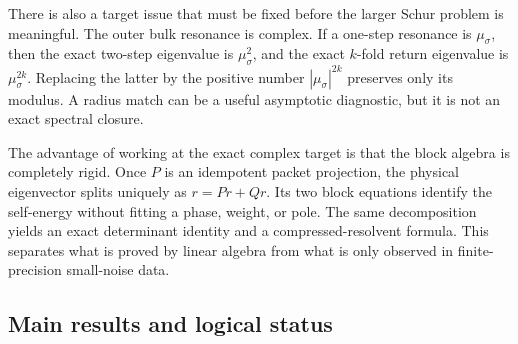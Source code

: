 \documentclass[11pt]{article}
\theoremstyle{definition}
\theoremstyle{remark}
\begin{document}
There is also a target issue that must be fixed before the larger Schur
problem is meaningful.  The outer bulk resonance is complex.  If a
one-step resonance is $\mu_\sigma$, then the exact two-step eigenvalue is
$\mu_\sigma^2$, and the exact $k$-fold return eigenvalue is
$\mu_\sigma^{2k}$.  Replacing the latter by the positive number
$|\mu_\sigma|^{2k}$ preserves only its modulus.  A radius match can be a
useful asymptotic diagnostic, but it is not an exact spectral closure.

The advantage of working at the exact complex target is that the block
algebra is completely rigid.  Once $P$ is an idempotent packet projection,
the physical eigenvector splits uniquely as $r=Pr+Qr$.  Its two block
equations identify the self-energy without fitting a phase, weight, or pole.
The same decomposition yields an exact determinant identity and a
compressed-resolvent formula.  This separates what is proved by linear
algebra from what is only observed in finite-precision small-noise data.

\subsection*{Main results and logical status}
\end{document}
